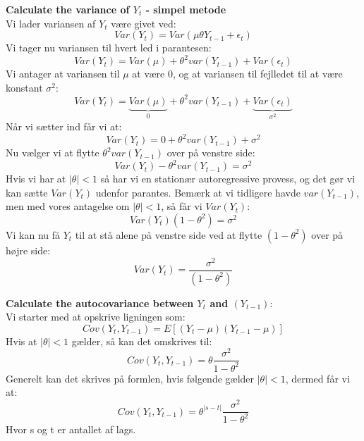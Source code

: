 \documentclass[
  10pt,
]{article}
\begin{document}
\textbf{Calculate the variance of $Y_t$ - simpel metode}\\
Vi lader variansen af \(Y_t\) være givet ved:\\
\[Var(Y_t) = Var(\mu \theta Y_{t-1} + \epsilon_t) \] Vi tager nu
variansen til hvert led i parantesen:\\
\[Var(Y_t) = Var(\mu) + \theta^2 var(Y_{t-1}) + Var(\epsilon_t) \] Vi
antager at variansen til \(\mu\) at være 0, og at variansen til
fejlledet til at være konstant \(\sigma^2\):\\
\[Var(Y_t) = \underbrace{Var(\mu)}_\text{0} + \theta^2 var(Y_{t-1}) + \underbrace{Var(\epsilon_t)}_\text{$\sigma^2$} \]
Når vi sætter ind får vi at:\\
\[Var(Y_t) = 0 + \theta^2 var(Y_{t-1}) + \sigma^2 \] Nu vælger vi at
flytte \(\theta^2 var(Y_{t-1})\) over på venstre side:\\
\[Var(Y_t) - \theta^2 var(Y_{t-1}) =   \sigma^2 \] Hvis vi har at
\(|\theta|<1\) så har vi en stationær autoregressive provess, og det gør
vi kan sætte \(Var(Y_t)\) udenfor parantes. Bemærk at vi tidligere havde
\(var(Y_{t-1})\), men med vores antagelse om \(|\theta|<1\), så får vi
\(Var(Y_t)\):\\
\[Var(Y_t)(1-\theta^2)  =   \sigma^2 \] Vi kan nu få \(Y_t\) til at stå
alene på venstre side ved at flytte \((1-\theta^2)\) over på højre
side:\\
\[Var(Y_t)  = \frac{\sigma^2}{(1-\theta^2)}   \]

\textbf{Calculate the autocovariance between $Y_t$ and $(Y_{t-1})$}:\\
Vi starter med at opskrive ligningen som:\\
\[Cov(Y_t,Y_{t-1}) = E[(Y_t - \mu)(Y_{t-1} -\mu)]   \] Hvis at
\(|\theta| < 1\) gælder, så kan det omskrives til:\\
\[Cov(Y_t,Y_{t-1}) = \theta \frac{\sigma^2}{1-\theta^2}   \] Generelt
kan det skrives på formlen, hvis følgende gælder \(|\theta| < 1\),
dermed får vi at:\\
\[Cov(Y_t,Y_{t-1}) = \theta^{|s-t|} \frac{\sigma^2}{1-\theta^2}   \]
Hvor s og t er antallet af lags.\\
\end{document}
